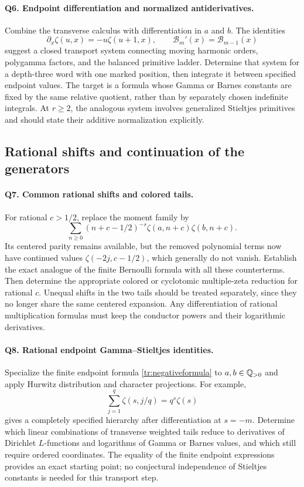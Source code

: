 \paragraph{Q6. Endpoint differentiation and normalized antiderivatives.}
Combine the transverse calculus with differentiation in $a$ and $b$.
The identities
\[
 \partial_x\zeta(u,x)=-u\zeta(u+1,x),\qquad
 \mathcal B_m'(x)=\mathcal B_{m-1}(x)
\]
suggest a closed transport system connecting moving harmonic orders,
polygamma factors, and the balanced primitive ladder. Determine that
system for a depth-three word with one marked position, then integrate
it between specified endpoint values. The target is a formula whose
Gamma or Barnes constants are fixed by the same relative quotient,
rather than by separately chosen indefinite integrals. At $r\geq2$,
the analogous system involves generalized Stieltjes primitives and
should state their additive normalization explicitly.

\subsection{Rational shifts and continuation of the generators}

\paragraph{Q7. Common rational shifts and colored tails.}
For rational $c>1/2$, replace the moment family by
\[
 \sum_{n\geq0}(n+c-1/2)^{-s}
                 \zeta(a,n+c)\zeta(b,n+c).
\]
Its centered parity remains available, but the removed polynomial
terms now have continued values $\zeta(-2j,c-1/2)$, which generally
do not vanish. Establish the exact analogue of the finite Bernoulli
formula with all these counterterms. Then determine the appropriate
colored or cyclotomic multiple-zeta reduction for rational $c$.
Unequal shifts in the two tails should be treated separately, since
they no longer share the same centered expansion. Any differentiation
of rational multiplication formulas must keep the conductor powers
and their logarithmic derivatives.

\paragraph{Q8. Rational endpoint Gamma--Stieltjes identities.}
Specialize the finite endpoint formula
\eqref{tr:negativeformula} to $a,b\in\mathbb Q_{>0}$ and apply Hurwitz
distribution and character projections. For example,
\[
 \sum_{j=1}^{q}\zeta(s,j/q)=q^s\zeta(s)
\]
gives a completely specified hierarchy after differentiation at
$s=-m$. Determine which linear combinations of transverse weighted
tails reduce to derivatives of Dirichlet $L$-functions and logarithms
of Gamma or Barnes values, and which still require ordered coordinates.
The equality of the finite endpoint expressions provides an exact
starting point; no conjectural independence of Stieltjes constants is
needed for this transport step.

